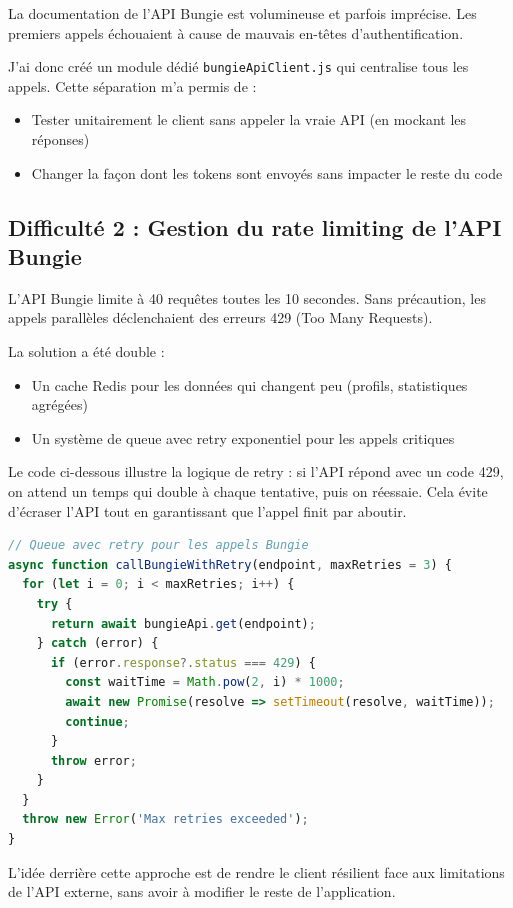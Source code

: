 La documentation de l'API Bungie est volumineuse et parfois imprécise. Les premiers appels échouaient à cause de mauvais en-têtes d'authentification.

J'ai donc créé un module dédié \texttt{bungieApiClient.js} qui centralise tous les appels. Cette séparation m'a permis de :
\begin{itemize}
    \item Tester unitairement le client sans appeler la vraie API (en mockant les réponses)
    \item Changer la façon dont les tokens sont envoyés sans impacter le reste du code
\end{itemize}

\subsection*{Difficulté 2 : Gestion du rate limiting de l'API Bungie}

L'API Bungie limite à 40 requêtes toutes les 10 secondes. Sans précaution, les appels parallèles déclenchaient des erreurs 429 (Too Many Requests).

La solution a été double :
\begin{itemize}
    \item Un cache Redis pour les données qui changent peu (profils, statistiques agrégées)
    \item Un système de queue avec retry exponentiel pour les appels critiques
\end{itemize}

Le code ci-dessous illustre la logique de retry : si l'API répond avec un code 429, on attend un temps qui double à chaque tentative, puis on réessaie. Cela évite d'écraser l'API tout en garantissant que l'appel finit par aboutir.

\begin{lstlisting}[language=JavaScript]
// Queue avec retry pour les appels Bungie
async function callBungieWithRetry(endpoint, maxRetries = 3) {
  for (let i = 0; i < maxRetries; i++) {
    try {
      return await bungieApi.get(endpoint);
    } catch (error) {
      if (error.response?.status === 429) {
        const waitTime = Math.pow(2, i) * 1000;
        await new Promise(resolve => setTimeout(resolve, waitTime));
        continue;
      }
      throw error;
    }
  }
  throw new Error('Max retries exceeded');
}
\end{lstlisting}

L'idée derrière cette approche est de rendre le client résilient face aux limitations de l'API externe, sans avoir à modifier le reste de l'application.

